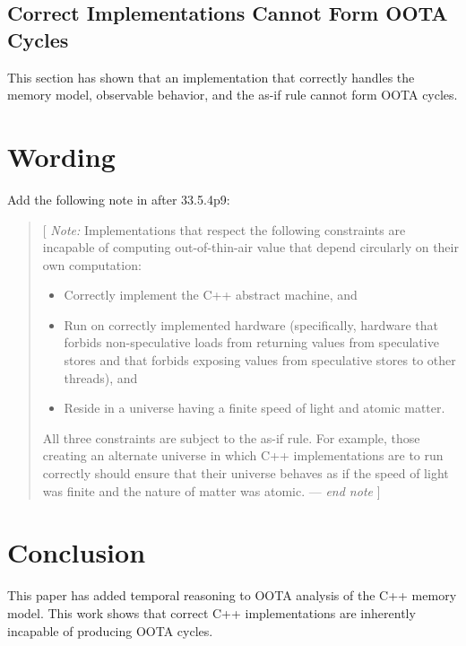 \documentclass[10]{article}
\begin{document}
\subsection{Correct Implementations Cannot Form OOTA Cycles}
\label{sec:Correct Implementations Cannot Form OOTA Cycles}

This section has shown that an implementation that correctly
handles the memory model, observable behavior, and the as-if rule
cannot form OOTA cycles.

\section{Wording}
\label{sec:Wording}

Add the following note in  after 33.5.4p9:

\begin{quote}
	[ \emph{Note:} Implementations that respect the following
	constraints are incapable of computing out-of-thin-air value
	that depend circularly on their own computation:

	\begin{itemize}
	\item	Correctly implement the C++ abstract machine, and
	\item	Run on correctly implemented hardware
		(specifically, hardware that forbids non-speculative
		loads from returning values from speculative stores
		and that forbids exposing values from speculative
		stores to other threads), and
	\item	Reside in a universe having a finite speed of light
		and atomic matter.
	\end{itemize}

	All three constraints are subject to the as-if rule.
	For example, those creating an alternate universe in which
	C++ implementations are to run correctly should ensure
	that their universe behaves as if the speed of light was
	finite and the nature of matter was atomic.
	--- \emph{end note} ]
\end{quote}

\section{Conclusion}
\label{sec:Conclusion}

This paper has added temporal reasoning to OOTA analysis of the C++
memory model.
This work shows that correct C++ implementations are inherently incapable
of producing OOTA cycles.
\end{document}
